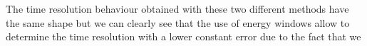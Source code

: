 \noindent The time resolution behaviour obtained with these two different methods have the same shape but we can clearly see that the use of energy windows allow to determine the time resolution with a lower constant error due to the fact that we 






















